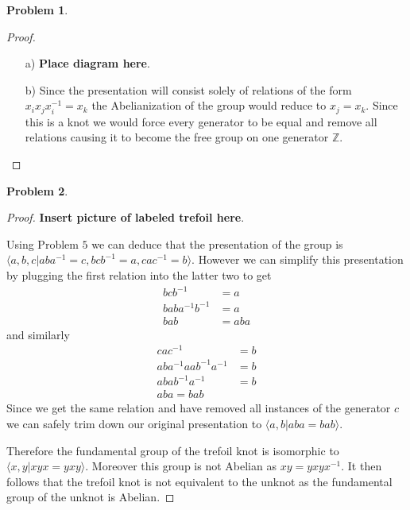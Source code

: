 \documentclass[10pt]{article}
\newcommand{\sk}{\vskip 10mm}
\newcommand{\bb}[1]{\mathbb{#1}}
\theoremstyle{plain}
\newtheorem{problem}{Problem}
\theoremstyle{remark}
\begin{document}
\sk

\begin{problem} %
  
\end{problem}

\begin{proof}
  \begin{itemize}
  \item[a)] \textbf{Place diagram here}. 
  \item[b)] Since the presentation will consist solely of relations of the
    form $x_ix_jx_i^{-1}=x_k$ the Abelianization of the group would reduce
    to $x_j=x_k$. Since this is a knot we would force every generator to be
    equal and remove all relations causing it to become the free group on one
    generator $\bb{Z}$.
  \end{itemize}
\end{proof}

\sk

\begin{problem} %
  
\end{problem}

\begin{proof}
  \textbf{Insert picture of labeled trefoil here}.

  Using Problem $5$ we can deduce that the presentation of the group is
  $\langle a,b,c | aba^{-1}=c,bcb^{-1}=a,cac^{-1}=b\rangle$. However we can simplify this
  presentation by plugging the first relation into the latter two to get
  \begin{align*}
    bcb^{-1} &= a\\
    baba^{-1}b^{-1} &= a \\
    bab &= aba
  \end{align*}
  and similarly
  \begin{align*}
    cac^{-1} &= b\\
    aba^{-1}aab^{-1}a^{-1} &= b \\
    abab^{-1}a^{-1} &= b\\
    aba = bab
  \end{align*}
  Since we get the same relation and have removed all instances of the generator
  $c$ we can safely trim down our original presentation to
  $\langle a,b| aba=bab\rangle$.

  Therefore the fundamental group of the trefoil knot is isomorphic to
  $\langle x,y| xyx=yxy\rangle$. Moreover this group is not Abelian as
  $xy = yxyx^{-1}$. It then follows that the trefoil knot is not equivalent to the
  unknot as the fundamental group of the unknot is Abelian.
\end{proof}

\sk

\end{document}
